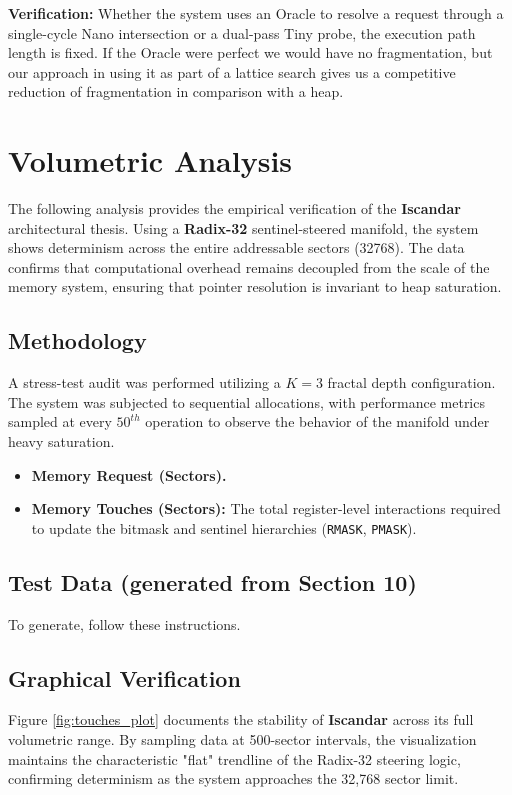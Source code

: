 \documentclass[11pt]{article}
\begin{document}
\noindent \textbf{Verification:} Whether the system uses an Oracle to resolve a request through a single-cycle Nano intersection or a dual-pass Tiny probe, the execution path length is fixed. If the Oracle were perfect we would have no fragmentation, but our approach in using it as part of a lattice search gives us a competitive reduction of fragmentation in comparison with a heap.

\section{Volumetric Analysis}

The following analysis provides the empirical verification of the \textbf{Iscandar} architectural thesis. Using a \textbf{Radix-32} sentinel-steered manifold, the system shows determinism across the entire addressable sectors (32768). The data confirms that computational overhead remains decoupled from the scale of the memory system, ensuring that pointer resolution is invariant to heap saturation.

\subsection{Methodology}
A stress-test audit was performed utilizing a $K=3$ fractal depth configuration. The system was subjected to sequential allocations, with performance metrics sampled at every $50^{th}$ operation to observe the behavior of the manifold under heavy saturation.{}
\begin{itemize}
    \item \textbf {Memory Request (Sectors).}
    \item \textbf{Memory Touches (Sectors):} The total register-level interactions required to update the bitmask and sentinel hierarchies (\texttt{RMASK}, \texttt{PMASK}).
\end{itemize}

\subsection{Test Data (generated from Section 10)}
  To generate, follow these instructions.

\subsection{Graphical Verification}

Figure \ref{fig:touches_plot} documents the stability of \textbf{Iscandar} across its full volumetric range. By sampling data at 500-sector intervals, the visualization maintains the characteristic "flat" trendline of the Radix-32 steering logic, confirming determinism as the system approaches the 32,768 sector limit.
\end{document}
